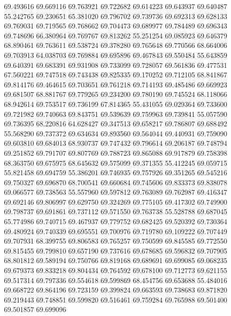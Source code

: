 69.493616
69.669116
69.763921
69.722682
69.614223
69.643937
69.640487
55.242765
69.230651
65.381020
69.796702
69.739736
69.692313
69.628133
69.769031
69.719565
69.768662
69.704473
69.689977
69.784489
69.696343
69.748696
66.380964
69.769767
69.813262
55.251254
69.085923
69.646379
68.890461
69.763611
69.538724
69.378280
69.765648
69.770566
68.664006
69.703913
64.038703
69.769884
69.695896
69.467843
69.550484
55.643859
69.640391
69.683391
69.931908
69.733099
69.728057
69.561836
69.477531
67.560221
69.747518
69.743438
69.825335
69.170252
69.712105
68.841867
69.814176
69.464615
69.703651
69.761218
69.714193
69.485486
69.669923
69.681507
68.881767
69.779265
69.234200
69.780190
69.745524
68.118066
68.942614
69.753517
69.736199
67.814365
55.431055
69.029364
69.733600
69.721982
69.740663
69.843751
69.539639
69.759963
69.739841
55.057590
69.736395
68.220816
64.628427
69.347513
69.658217
69.786807
69.688492
55.568290
69.737372
69.634634
69.893560
69.564044
69.440931
69.759090
69.603810
69.684013
68.930737
69.747432
69.796614
69.206187
69.748794
69.251852
69.791707
69.807769
69.788723
69.865088
69.917879
69.758398
68.363750
69.675975
68.645632
69.575099
69.371355
55.412245
69.059715
55.821458
69.694759
55.386201
69.746935
69.757926
69.351265
69.545216
69.750327
69.696870
68.700541
69.660684
69.745606
69.833373
69.838078
69.066577
69.738563
55.557960
69.597812
69.763089
69.762987
69.416347
69.692146
69.806997
69.629750
69.324269
69.775105
69.417302
69.749900
69.798737
69.691861
69.737112
69.571550
69.763738
55.528788
69.687045
65.774986
69.740715
69.467937
69.779752
69.682425
69.520392
69.730364
69.480924
69.740339
69.695551
69.700976
69.719780
69.109222
69.707449
69.707931
68.399755
69.806583
69.765257
69.750599
69.845585
69.772550
69.815455
69.799810
69.657190
69.737616
69.678685
69.596832
69.707905
68.801812
69.589194
69.750766
69.819168
69.689691
69.699085
69.068235
69.679373
69.833218
69.804434
69.764592
69.678100
69.712773
69.621155
69.517314
69.797336
69.554618
69.599869
68.454756
69.653688
55.484016
69.668722
69.864196
69.723159
69.399824
69.663593
69.738683
69.871820
69.219443
69.748851
69.599820
69.516461
69.759284
69.765988
69.501400
69.501857
69.699096
